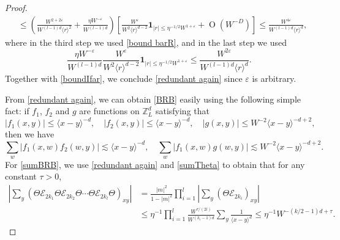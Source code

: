\documentclass{article}
\newcommand{\1}{\mathds{1}}
\numberwithin{equation}{section}
\newcommand{\al}{\alpha}
\newcommand{\e}{{\varepsilon}}
\renewcommand{\cal}{\mathcal}
\renewcommand{\leq}{\leqslant}
\renewcommand{\le}{\leq}
\newcommand{\Z}{\mathbb{Z}}
\DeclareMathOperator{\OO}{O}
\theoremstyle{plain} %
\theoremstyle{remark}
\newcommand{\Sdelta}{{\Sigma}_T}
\newcommand{\Sele}{{\mathcal E}}
\begin{document}
\begin{proof}
\begin{align*}
		& \le \left(\frac{W^{2+2\e}}{W^{(l-1)d} \langle r\rangle^2 } + \frac{\eta W^{-\e}}{W^{(l-1)d}}\right) \left[  \frac{W^\e}{W^2\langle r\rangle^{d-2}}\mathbf 1_{|r|\le   \eta^{-1/2}W^{1+\e}}   + \OO(W^{-D})\right]\le \frac{W^{4\e}}{W^{(l-1)d} \langle r\rangle^{d}},
	\end{align*}
	where in the third step we used \eqref{bound barR}, and in the last step we used %
	$$\frac{\eta W^{-\e}}{W^{(l-1)d}}\frac{W^\e}{W^2\langle r\rangle^{d-2}}\mathbf 1_{|r|\le   \eta^{-1/2}W^{1+\e}}  \le  \frac{W^{2\e}}{W^{(l-1)d} \langle r\rangle^{d}}.$$
	Together with \eqref{boundIfar}, we conclude \eqref{redundant again} since $\e$ is arbitrary. 
	
	From \eqref{redundant again}, we can obtain \eqref{BRB} easily using the following simple fact: if $f_1$, $f_2$ and $g$ are functions on $\Z_L^d$ satisfying that
	$$|f_1(x,y)| \le \langle x-y\rangle^{-d}, \quad |f_2(x,y)| \le \langle x-y\rangle^{-d},\quad |g(x,y)| \le W^{-2}\langle x-y\rangle^{-d+2},$$
	then we have
	$$\sum_w \left|f_1(x,w)f_2(w,y)\right|\lesssim \langle x-y\rangle^{-d},\quad \sum_w \left|f_1(x,w)g(w,y)\right|\lesssim W^{-2} \langle x-y\rangle^{-d+2}. $$
	For \eqref{sumBRB}, we use \eqref{redundant again} and \eqref{sumTheta} to obtain that for any constant $\tau>0$,
	\begin{align*}
		\left|\sum_y (\Theta \Sele_{2k_1}\Theta  \Sele_{2k_2}\Theta \cdots \Theta  \Sele_{2k_l}\Theta)_{xy}\right|&= \frac{|m|^2}{1-|m|^2}\prod_{i=1}^l \left|\sum_{y}(\Theta \Sele_{2k_i})_{xy}\right| \\
		&\le \eta^{-1} \prod_{i=1}^l \frac{W^{\tau/(2l)}}{W^{(k_i-1)d}}\sum_{y}\frac1{\langle x-y\rangle^{d}} \le \eta^{-1}W^{-(k/2-1)d+\tau}.
	\end{align*}
	
\end{proof}
\end{document}
